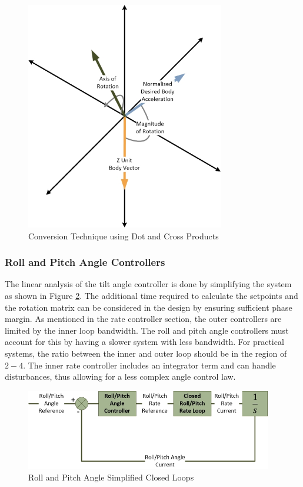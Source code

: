 		\begin{figure}[H]
			\centering
			\includegraphics[height = 10cm]{../References/Diagrams/ConversionMethod.jpg}
			\caption{Conversion Technique using Dot and Cross Products}
			\label{IM_AngleMethod}
		\end{figure}
	
		\subsubsection{Roll and Pitch Angle Controllers}
		The linear analysis of the tilt angle controller is done by simplifying the system as shown in Figure \ref{IM_RollAngleLoop}. The additional time required to calculate the setpoints and the rotation matrix can be considered in the design by ensuring sufficient phase margin. As mentioned in the rate controller section, the outer controllers are limited by the inner loop bandwidth. The roll and pitch angle controllers must account for this by having a slower system with less bandwidth. For practical systems, the ratio between the inner and outer loop should be in the region of $2 - 4$. The inner rate controller includes an integrator term and can handle disturbances, thus allowing for a less complex angle control law. 
		
		\begin{figure}[H]
			\centering
			\includegraphics[height = 3.5cm]{../References/Diagrams/RollPitchAngleLoop.jpg}
			\caption{Roll and Pitch Angle Simplified Closed Loops}
			\label{IM_RollAngleLoop}
		\end{figure}
		
